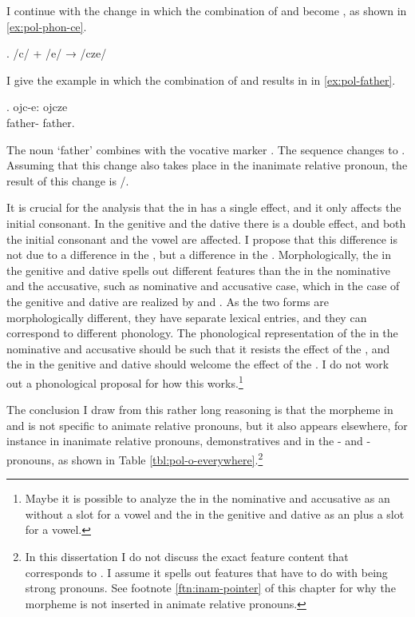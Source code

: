 I continue with the change in which the combination of  and  become , as shown in \ref{ex:pol-phon-ce}.

\ex.\label{ex:pol-phon-ce}
/c/ + /e/ → /cze/

I give the example in which the combination of  and  results in  in \ref{ex:pol-father}.

\exg. ojc-e: ojcze\\
 father- father.\\
\label{ex:pol-father}

The noun  `father' combines with the vocative marker . The sequence  changes to . Assuming that this change also takes place in the inanimate relative pronoun, the result of this change is /.

It is crucial for the analysis that the  in  has a single effect, and it only affects the initial consonant. In the genitive and the dative there is a double effect, and both the initial consonant and the vowel are affected. I propose that this difference is not due to a difference in the , but a difference in the . Morphologically, the  in the genitive and dative spells out different features than the  in the nominative and the accusative, such as nominative and accusative case, which in the case of the genitive and dative are realized by  and . As the two forms are morphologically different, they have separate lexical entries, and they can correspond to different phonology. The phonological representation of the  in the nominative and accusative should be such that it resists the effect of the , and the  in the genitive and dative should welcome the effect of the . I do not work out a phonological proposal for how this works.\footnote{
Maybe it is possible to analyze the  in the nominative and accusative as an  without a slot for a vowel and the  in the genitive and dative as an  plus a slot for a vowel.
}

The conclusion I draw from this rather long reasoning is that the morpheme  in  and  is not specific to animate relative pronouns, but it also appears elsewhere, for instance in inanimate relative pronouns, demonstratives and in the - and -pronouns, as shown in Table \ref{tbl:pol-o-everywhere}.\footnote{
In this dissertation I do not discuss the exact feature content that corresponds to . I assume it spells out features that have to do with being strong pronouns. See footnote \ref{ftn:inam-pointer} of this chapter for why the morpheme is not inserted in animate relative pronouns.
}

